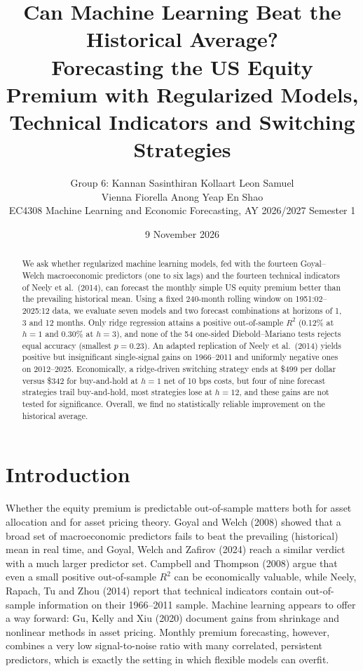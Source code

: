 \documentclass[11pt,a4paper]{article}
\title{\vspace{-1.2cm}Can Machine Learning Beat the Historical Average?\\[1mm]
Forecasting the US Equity Premium with Regularized Models,\\Technical Indicators and Switching Strategies\vspace{-2mm}}
\author{Group 6: Kannan Sasinthiran \quad Kollaart Leon Samuel\\ Vienna Fiorella Anong \quad Yeap En Shao\\[1mm]
EC4308 Machine Learning and Economic Forecasting, AY 2026/2027 Semester 1}
\date{9 November 2026}
\begin{document}
\maketitle
\vspace{-0.8cm}

\begin{abstract}
\normalsize\noindent We ask whether regularized machine learning models, fed with the
fourteen Goyal--Welch macroeconomic predictors (one to six lags) and the
fourteen technical indicators of Neely et al.\ (2014), can forecast the
monthly simple US equity premium better than the prevailing historical mean.
Using a fixed 240-month rolling window on 1951:02--2025:12 data, we evaluate
seven models and two forecast combinations at horizons of 1, 3 and 12 months.
Only ridge regression attains a positive out-of-sample $R^2$ (0.12\% at
$h=1$ and 0.30\% at $h=3$), and none of the 54 one-sided Diebold--Mariano
tests rejects equal accuracy (smallest $p=0.23$). An adapted replication of
Neely et al.\ (2014) yields positive but insignificant single-signal gains
on 1966--2011 and uniformly negative ones on 2012--2025. Economically, a
ridge-driven switching strategy ends at \$499 per dollar versus \$342 for
buy-and-hold at $h=1$ net of 10 bps costs, but four of nine forecast
strategies trail buy-and-hold, most strategies lose at $h=12$, and these
gains are not tested for significance. Overall, we find no statistically
reliable improvement on the historical average.
\end{abstract}

\section{Introduction}\label{sec:intro}
Whether the equity premium is predictable out-of-sample matters both for
asset allocation and for asset pricing theory. Goyal and Welch (2008) showed
that a broad set of macroeconomic predictors fails to beat the prevailing
(historical) mean in real time, and Goyal, Welch and Zafirov (2024) reach a
similar verdict with a much larger predictor set. Campbell and Thompson
(2008) argue that even a small positive out-of-sample $R^2$ can be
economically valuable, while Neely, Rapach, Tu and Zhou (2014) report that
technical indicators contain out-of-sample information on their 1966--2011
sample. Machine learning appears to offer a way forward: Gu, Kelly and Xiu
(2020) document gains from shrinkage and nonlinear methods in asset pricing.
Monthly premium forecasting, however, combines a very low signal-to-noise
ratio with many correlated, persistent predictors, which is exactly the setting in
which flexible models can overfit.
\end{document}
